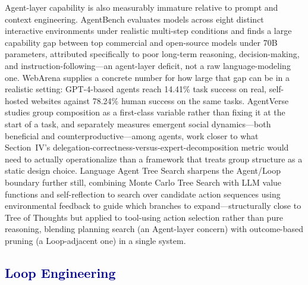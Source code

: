\documentclass[journal]{IEEEtran}
\begin{document}
Agent-layer capability is also measurably immature relative to prompt and context engineering. AgentBench \cite{liu2023agentbench} evaluates models across eight distinct interactive environments under realistic multi-step conditions and finds a large capability gap between top commercial and open-source models under 70B parameters, attributed specifically to poor long-term reasoning, decision-making, and instruction-following---an agent-layer deficit, not a raw language-modeling one. WebArena \cite{zhou2023webarena} supplies a concrete number for how large that gap can be in a realistic setting: GPT-4-based agents reach 14.41\% task success on real, self-hosted websites against 78.24\% human success on the same tasks. AgentVerse \cite{chen2023agentverse} studies group composition as a first-class variable rather than fixing it at the start of a task, and separately measures emergent social dynamics---both beneficial and counterproductive---among agents, work closer to what Section~IV's delegation-correctness-versus-expert-decomposition metric would need to actually operationalize than a framework that treats group structure as a static design choice. Language Agent Tree Search \cite{zhou2023lats} sharpens the Agent/Loop boundary further still, combining Monte Carlo Tree Search with LLM value functions and self-reflection to search over candidate action sequences using environmental feedback to guide which branches to expand---structurally close to Tree of Thoughts but applied to tool-using action selection rather than pure reasoning, blending planning search (an Agent-layer concern) with outcome-based pruning (a Loop-adjacent one) in a single system.

\subsection{\textcolor{darkblue}{Loop Engineering}}
\end{document}
